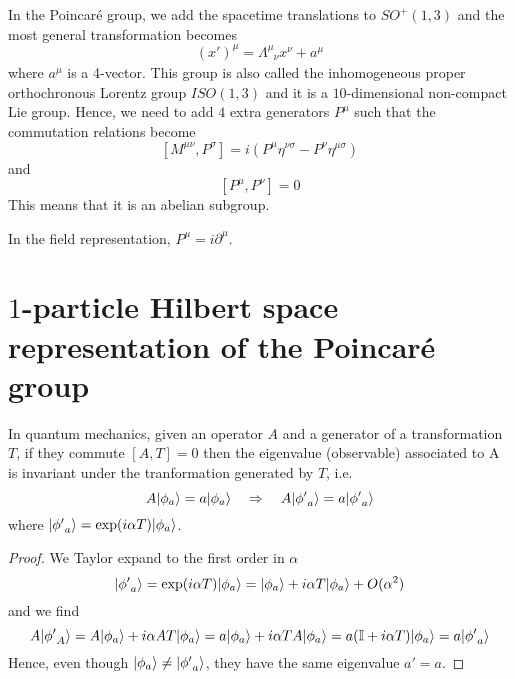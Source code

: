     In the Poincaré group, we add the spacetime translations to $SO^+(1,3)$ and the most general transformation becomes 
    \begin{equation*}
        (x')^\mu = \Lambda^\mu_{\phantom \mu \nu} x^\nu + a^\mu
    \end{equation*}
    where $a^\mu$ is a 4-vector. This group is also called the inhomogeneous proper orthochronous Lorentz group $ISO(1,3)$ and it is a $10$-dimensional non-compact Lie group. Hence, we need to add $4$ extra generators $P^\mu$ such that the commutation relations become
    \begin{equation}\label{comm:mp}
        [M^{\mu\nu}, P^\sigma] = i (P^\mu \eta^{\nu\sigma} - P^\nu \eta^{\mu \sigma})
    \end{equation}
    and
    \begin{equation} \label{comm:pp}
        [P^\mu, P^\nu] = 0 
    \end{equation}
    This means that it is an abelian subgroup.

    In the field representation, $P^\mu = i \partial^\mu$.

\section{$1$-particle Hilbert space representation of the Poincaré group}
    
    In quantum mechanics, given an operator $A$ and a generator of a transformation $T$, if they commute $[A, T] = 0$ then the eigenvalue (observable) associated to A is invariant under the tranformation generated by $T$, i.e. 
    \begin{equation*}
        A \vert\phi_a\rangle = a \vert\phi_a\rangle \quad \Rightarrow \quad A \vert{\phi'}_a\rangle = a \vert{\phi'}_a\rangle
    \end{equation*}
    where $\vert{\phi'}_a\rangle = \exp(i \alpha T) \vert\phi_a\rangle$.
    
    \begin{proof}
        We Taylor expand to the first order in $\alpha$
        \begin{equation*}
            \vert{\phi'}_a\rangle = \exp(i \alpha T) \vert\phi_a\rangle = \vert\phi_a\rangle + i \alpha T \vert\phi_a\rangle + O(\alpha^2)
        \end{equation*}
        and we find
        \begin{equation*}
            A \vert{\phi'}_A\rangle = A \vert\phi_a\rangle + i \alpha A T \vert\phi_a\rangle = a \vert\phi_a\rangle + i \alpha T A \vert\phi_a\rangle = a (\mathbb I + i \alpha T) \vert\phi_a\rangle = a \vert{\phi'}_a\rangle
        \end{equation*}
        Hence, even though $\vert\phi_a\rangle \neq \vert{\phi'}_a\rangle$, they have the same eigenvalue $a' = a$.
    \end{proof}

